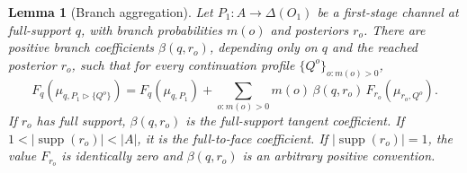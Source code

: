 \documentclass[11pt,a4paper]{article}
\newtheorem{lemma}[theorem]{Lemma}
\theoremstyle{definition}
\newcommand{\1}{\mathbf 1}
\begin{document}
\begin{lemma}[Branch aggregation]\label{lem:branchagg}
Let $P_1:A\to\Delta(O_1)$ be a first-stage channel at full-support $q$, with branch probabilities $m(o)$ and posteriors
$r_o$.  There are positive branch coefficients $\beta(q,r_o)$, depending only on $q$ and the reached posterior $r_o$,
such that for every continuation profile $\{Q^o\}_{o:m(o)>0}$,
\[
F_q(\mu_{q,P_1\triangleright\{Q^o\}})
=
F_q(\mu_{q,P_1})+
\sum_{o:m(o)>0}m(o)\,\beta(q,r_o)\,
F_{r_o}(\mu_{r_o,Q^o}).
\]
If $r_o$ has full support, $\beta(q,r_o)$ is the full-support tangent coefficient.  If
$1<|\operatorname{supp}(r_o)|<|A|$, it is the full-to-face coefficient.  If $|\operatorname{supp}(r_o)|=1$, the value
$F_{r_o}$ is identically zero and $\beta(q,r_o)$ is an arbitrary positive convention.
\end{lemma}
\end{document}
